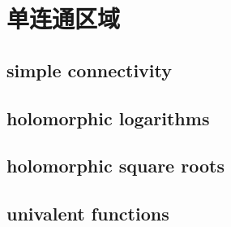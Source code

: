 \section{单连通区域}
\label{b3:sec:0501}


\subsection{simple connectivity}
\label{b3:subsec:050101}

\subsection{holomorphic logarithms}
\label{b3:subsec:050102}

\subsection{holomorphic square roots}
\label{b3:subsec:050103}

\subsection{univalent functions}
\label{b3:subsec:050104}


